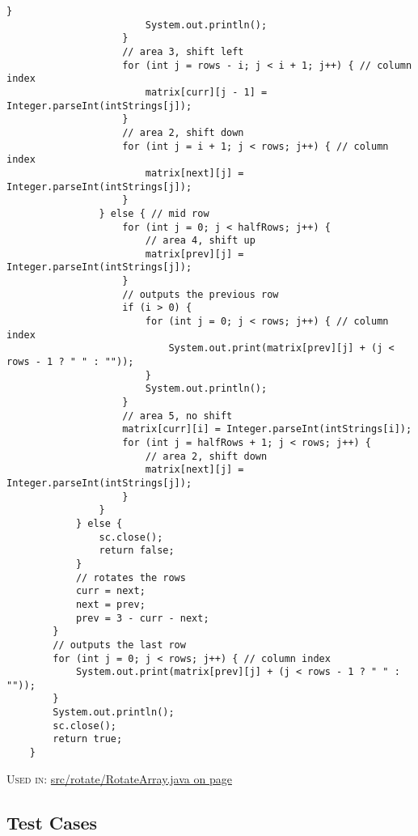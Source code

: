 \begin{lstlisting}[title={<Input Rotate and Output 31>}, label=Listing31]
                        }
                        System.out.println();
                    }
                    // area 3, shift left
                    for (int j = rows - i; j < i + 1; j++) { // column index
                        matrix[curr][j - 1] = Integer.parseInt(intStrings[j]);
                    }
                    // area 2, shift down
                    for (int j = i + 1; j < rows; j++) { // column index
                        matrix[next][j] = Integer.parseInt(intStrings[j]);
                    }                    
                } else { // mid row
                    for (int j = 0; j < halfRows; j++) {
                        // area 4, shift up
                        matrix[prev][j] = Integer.parseInt(intStrings[j]);
                    }
                    // outputs the previous row
                    if (i > 0) {
                        for (int j = 0; j < rows; j++) { // column index
                            System.out.print(matrix[prev][j] + (j < rows - 1 ? " " : ""));                
                        }
                        System.out.println();
                    }
                    // area 5, no shift
                    matrix[curr][i] = Integer.parseInt(intStrings[i]);
                    for (int j = halfRows + 1; j < rows; j++) {
                        // area 2, shift down
                        matrix[next][j] = Integer.parseInt(intStrings[j]);
                    }
                }
            } else {
                sc.close();
                return false;
            }
            // rotates the rows
            curr = next;
            next = prev;
            prev = 3 - curr - next;
        }
        // outputs the last row
        for (int j = 0; j < rows; j++) { // column index
            System.out.print(matrix[prev][j] + (j < rows - 1 ? " " : ""));                
        }
        System.out.println();
        sc.close();
        return true;
    }
\end{lstlisting}\begin{footnotesize} \textsc{Used in}: \hyperref[Listing29]{s\-r\-c\-/\-r\-o\-t\-a\-t\-e\-/\-R\-o\-t\-a\-t\-e\-A\-r\-r\-a\-y\-.\-j\-a\-v\-a on page} \pageref{Listing29}  \end{footnotesize}\vskip 5mm\noindent
\subsection{Test Cases}

